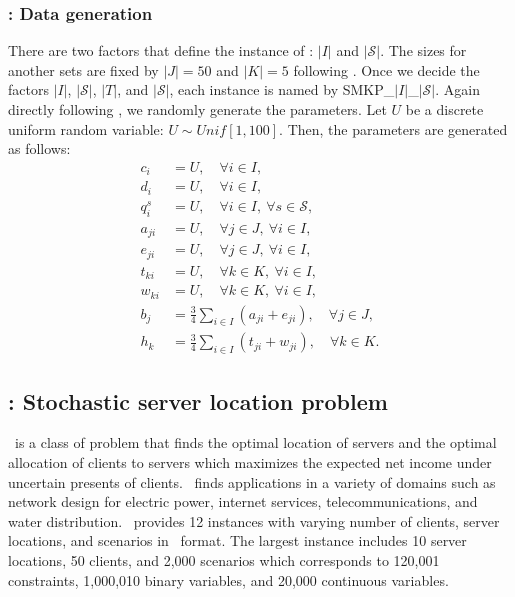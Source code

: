 \subsubsection{\smkp: Data generation}
There are two factors that define the instance of \smkp: $|I|$ and $|\mathcal{S}|$. The sizes for another sets are fixed by $|J|=50$ and $|K|=5$ following \cite{journal:AAD2014}. Once we decide the factors $|I|$, $|\mathcal{S}|$, $|T|$, and $|\mathcal{S}|$, each instance is named by SMKP\_$|I|$\_$|\mathcal{S}|$. Again directly following \cite{journal:AAD2014}, we randomly generate the parameters. Let $U$ be a discrete uniform random variable: $U\sim Unif[1,100]$. Then, the parameters are generated as follows:
\begin{align*}
c_i		&=	U,\quad\forall i\in I, \\
d_i		&=	U,\quad\forall i\in I, \\
q_i^s	&= 	U,\quad\forall i\in I,\ \forall s\in\mathcal{S},\\
a_{ji}	&=	U,\quad\forall j\in J,\ \forall i\in I, \\
e_{ji}	&=	U,\quad\forall j\in J,\ \forall i\in I, \\
t_{ki}	&=	U,\quad\forall k\in K,\ \forall i\in I, \\
w_{ki}	&=	U,\quad\forall k\in K,\ \forall i\in I,  \\
b_j		&=	\frac{3}{4}\sum_{i\in I}\left(a_{ji}+e_{ji}\right),\quad\forall j\in J, \\
h_k		&=	\frac{3}{4}\sum_{i\in I}\left(t_{ji}+w_{ji}\right),\quad\forall k\in K. 
\end{align*}

\subsection{\sslp: Stochastic server location problem} \label{SSLP}
\sslp\ is a class of problem that finds the optimal location of servers and the optimal allocation of clients to servers which maximizes the expected net income under uncertain presents of clients. \sslp\ finds applications in a variety of domains such as network design for electric power, internet services, telecommunications, and water distribution. \siplib\ provides 12 instances with varying number of clients, server locations, and scenarios in \smps\ format. The largest instance includes 10 server locations, 50 clients, and 2,000 scenarios which corresponds to 120,001 constraints, 1,000,010 binary variables, and 20,000 continuous variables.


